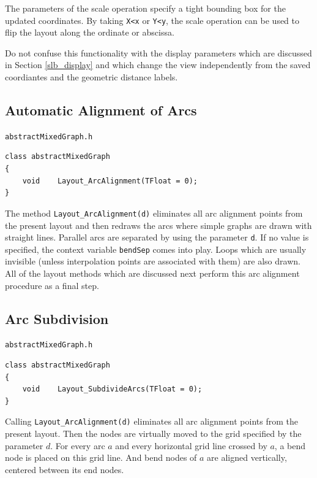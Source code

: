 \documentclass[a4paper,11pt,twoside]{book}
\begin{document}
\begin{multicols}{2}
The parameters of the scale operation specify a tight bounding box for the
updated coordinates. By taking \verb/X<x/ or \verb/Y<y/, the scale operation
can be used to flip the layout along the ordinate or abscissa.

Do not confuse this functionality with the display parameters which are
discussed in Section \ref{slb_display} and which change the view independently
from the saved coordiantes and the geometric distance labels.


\subsection{Automatic Alignment of Arcs}
\label{slb_auto_arc_alignment}
\myinclude\verb/abstractMixedGraph.h/
\begin{mymethods}
\begin{verbatim}
class abstractMixedGraph
{
    void    Layout_ArcAlignment(TFloat = 0);
}
\end{verbatim}
\end{mymethods}
The method \verb/Layout_ArcAlignment(d)/ eliminates all arc alignment points
from the present layout and then redraws the arcs where simple graphs are
drawn with straight lines. Parallel arcs are separated by using the parameter
\verb/d/. If no value is specified, the context variable \verb/bendSep/ comes
into play. Loops which are usually invisible (unless interpolation points are
associated with them) are also drawn.
All of the layout methods which are discussed next perform this arc alignment
procedure as a final step.


\subsection{Arc Subdivision}
\myinclude\verb/abstractMixedGraph.h/
\begin{mymethods}
\begin{verbatim}
class abstractMixedGraph
{
    void    Layout_SubdivideArcs(TFloat = 0);
}
\end{verbatim}
\end{mymethods}
Calling \verb/Layout_ArcAlignment(d)/ eliminates all arc alignment points from
the present layout. Then the nodes are virtually moved to the grid specified
by the parameter $d$. For every arc $a$ and every horizontal grid line crossed
by $a$, a bend node is placed on this grid line. And bend nodes of $a$ are
aligned vertically, centered between its end nodes.




\end{multicols}
\end{document}
